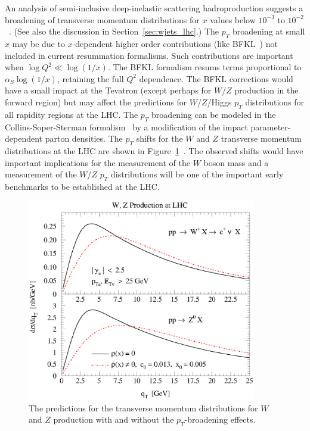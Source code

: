 \documentclass[12pt]{iopart}
\def\as{\alpha_S}
\begin{document}
An analysis of semi-inclusive deep-inelastic scattering hadroproduction suggests a broadening of transverse
momentum distributions for $x$ values below $10^{-3}$ to $10^{-2}$~\cite{Berge:2004nt}. (See also the discussion in Section~\ref{sec:wjets_lhc}.)  The $p_T$ broadening at
small $x$ may be due to $x$-dependent higher order contributions (like BFKL~\cite{Fadin:1975cb,Kuraev:1976ge,Kuraev:1977fs,Balitsky:1978ic}) not included in current resummation
formalisms. Such contributions are important when $\log Q^2 \ll \log(1/x)$. The BFKL formalism resums terms proportional to $\as \log(1/x)$,
retaining the full $Q^2$ dependence. The BFKL corrections would have a small impact at the Tevatron (except perhaps for $W$/$Z$ production
in the forward region) but may affect the predictions for $W$/$Z$/Higgs $p_T$ distributions for all rapidity regions at the LHC.
The $p_T$ broadening can be modeled in the Collins-Soper-Sterman formalism~\cite{Collins:1985gm} by a modification of the impact
parameter-dependent parton densities. The $p_T$ shifts for the $W$ and $Z$ transverse momentum distributions at
the LHC are shown in Figure~\ref{fig:wz_pt}~\cite{Berge:2005nm}. The observed shifts would have important
implications for the measurement of the $W$ boson mass and a measurement of the $W$/$Z$ $p_T$ distributions will be one of
the important early benchmarks to be established at the LHC. 
%
\begin{figure}[t]
\begin{center}
\includegraphics[width=10cm]{wpm_lhc_ct6_25y_pt25_comb.eps}
\end{center}
\vspace*{-0.5cm}
\caption{
The predictions for the transverse momentum distributions for $W$ and $Z$ production with and
without the $p_T$-broadening effects.
\label{fig:wz_pt}
}
\end{figure}
%
\end{document}
